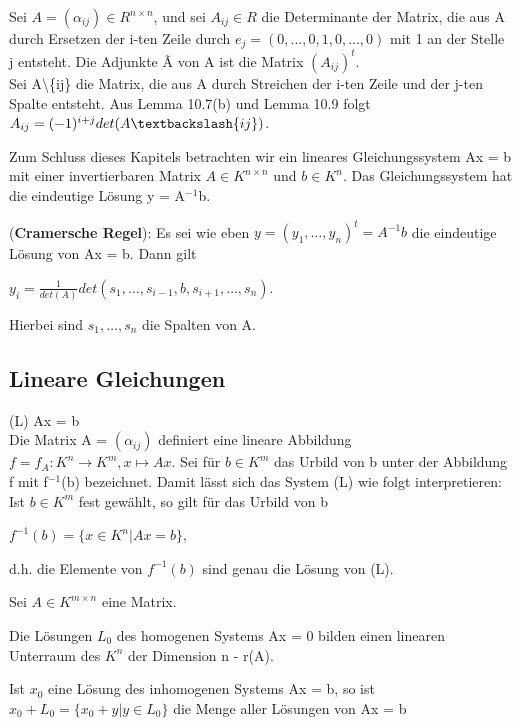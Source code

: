 \begin{definition}
Sei $A = (\alpha_{ij}) \in R^{n \times n}$, und sei $A_{ij} \in R$ die Determinante der Matrix, die aus A durch Ersetzen der i-ten Zeile durch $e_j = (0,...,0,1,0,...,0)$ mit 1 an der Stelle j entsteht. Die Adjunkte \~{A} von A ist die Matrix $(A_{ij})^t$.\\
Sei A\textbackslash\{ij\} die Matrix, die aus A durch Streichen der i-ten Zeile und der j-ten Spalte entsteht. Aus Lemma 10.7(b) und Lemma 10.9 folgt $A_{ij} =(-1)^{i+j} det(A\textbackslash\{ij\})$.
\end{definition}

Zum Schluss dieses Kapitels betrachten wir ein lineares Gleichungssystem Ax = b mit einer invertierbaren Matrix $A \in K^{n \times n}$ und $b \in K^n$. Das Gleichungssystem hat die eindeutige Lösung y = A$^{-1}$b.

\begin{theorem}
(\textbf{Cramersche Regel}): Es sei wie eben $y = (y_1, …, y_n)^t = A^{-1}b$ die eindeutige Lösung von Ax = b. Dann gilt
\begin{center}
$y_i = \frac{1}{det(A)} det(s_1, …, s_{i-1}, b, s_{i+1}, …, s_n)$.
\end{center}
Hierbei sind $s_1, …, s_n$ die Spalten von A.
\end{theorem}

\subsection{Lineare Gleichungen}
(L)  Ax = b\\
Die Matrix A = $(\alpha_{ij})$ definiert eine lineare Abbildung $f = f_A: K^n \to K^m, x \mapsto Ax$. Sei für $b \in K^m$ das Urbild von b unter der Abbildung f mit f$^{-1}$(b) bezeichnet. Damit lässt sich das System (L) wie folgt interpretieren: Ist $b \in K^m$ fest gewählt, so gilt für das Urbild von b
\begin{center}
$f^{-1}(b) = \{x \in K^n | Ax = b\}$,
\end{center}
d.h. die Elemente von $f^{-1}(b)$ sind genau die Lösung von (L).

\begin{lemma}
Sei $A \in K^{m \times n}$ eine Matrix.
\begin{compactenum}
\item Die Lösungen $L_0$ des homogenen Systems Ax = 0 bilden einen linearen Unterraum des $K^n$ der Dimension n - r(A).
\item Ist $x_0$ eine Lösung des inhomogenen Systems Ax = b, so ist $x_0 + L_0 = \{x_0 +y | y \in L_0\}$ die Menge aller Lösungen von Ax = b
\end{compactenum}
\end{lemma}

